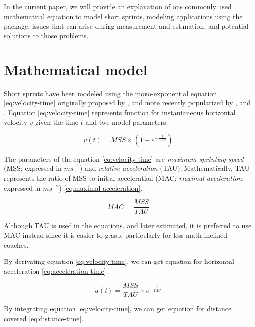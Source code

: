 \documentclass[
]{jss}
\begin{document}
In the current paper, we will provide an explanation of one commonly used mathematical equation to model short sprints, modeling applications using the  package, issues that can arise during measurement and estimation, and potential solutions to those problems.

\hypertarget{mathematical-model}{%
\section{Mathematical model}\label{mathematical-model}}

Short sprints have been modeled using the mono-exponential equation \eqref{eq:velocity-time} originally proposed by \citet{doi:10.1098/rspb.1927.0035}, and more recently popularized by \citet{clarkNFLCombine40Yard2017}, and \citet{samozinoSimpleMethodMeasuring2016}. Equation \eqref{eq:velocity-time} represents function for instantaneous horizontal velocity \(v\) given the time \(t\) and two model parameters:

\begin{equation}
  v(t) = MSS \times (1 - e^{-\frac{t}{TAU}}) \label{eq:velocity-time}
\end{equation}

The parameters of the equation \eqref{eq:velocity-time} are \textit{maximum sprinting speed} (MSS; expressed in \(ms^{-1}\)) and \textit{relative acceleration} (TAU). Mathematically, TAU represents the ratio of MSS to initial acceleration (MAC; \textit{maximal acceleration}, expressed in \(ms^{-2}\)) \eqref{eq:maximal-acceleration}.

\begin{equation}
  MAC = \frac{MSS}{TAU}\label{eq:maximal-acceleration}
\end{equation}

Although TAU is used in the equations, and later estimated, it is preferred to use MAC instead since it is easier to grasp, particularly for less math inclined coaches.

By derivating equation \eqref{eq:velocity-time}, we can get equation for horizontal acceleration \eqref{eq:acceleration-time}.

\begin{equation}
  a(t) = \frac{MSS}{TAU} \times e^{-\frac{t}{TAU}}  \label{eq:acceleration-time}
\end{equation}

By integrating equation \eqref{eq:velocity-time}, we can get equation for distance covered \eqref{eq:distance-time}.
\end{document}
